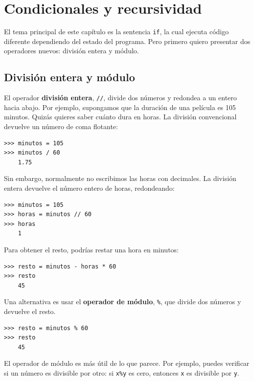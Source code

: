\documentclass[10pt]{book}
\begin{document}
\chapter{Condicionales y recursividad}

El tema principal de este capítulo es la sentencia {\tt if}, la cual
ejecuta código diferente dependiendo del estado del programa.
Pero primero quiero presentar dos operadores nuevos: división entera
y módulo.


\section{División entera y módulo}

El operador {\bf división entera}, \verb"//", divide
dos números y redondea a un entero hacia abajo.  Por ejemplo, supongamos que la
duración de una película es 105 minutos.  Quizás quieres saber
cuánto dura en horas.  La división convencional
devuelve un número de coma flotante:

\begin{verbatim}
>>> minutos = 105
>>> minutos / 60
    1.75
\end{verbatim}

Sin embargo, normalmente no escribimos las horas con decimales.  La división
entera devuelve el número entero de horas, redondeando:

\begin{verbatim}
>>> minutos = 105
>>> horas = minutos // 60
>>> horas
    1
\end{verbatim}

Para obtener el resto, podrías restar una hora en minutos:

\begin{verbatim}
>>> resto = minutos - horas * 60
>>> resto
    45
\end{verbatim}


Una alternativa es usar el {\bf operador de módulo}, \verb"%", que
divide dos números y devuelve el resto.

\begin{verbatim}
>>> resto = minutos % 60
>>> resto
    45
\end{verbatim}
%
El operador de módulo es más útil de lo que parece.  Por
ejemplo, puedes verificar si un número es divisible por otro: si
{\tt x\%y} es cero, entonces {\tt x} es divisible por {\tt y}.
\end{document}
